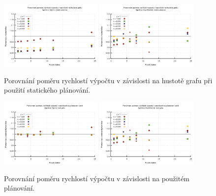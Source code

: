 \begin{figure}
    \centering
    \includegraphics[width=0.45\textwidth]{../grafy/02_openMP/02-04-Dijkstra_hustota_v1}
    \includegraphics[width=0.45\textwidth]{../grafy/02_openMP/02-04-Floyd_hustota_v1}
    \caption{Porovnání poměru rychlostí výpočtu v závislosti na hustotě grafu při použití statického plánování.}
    \label{f:mer:pomerhustota}
\end{figure}

\begin{figure}
    \centering
    \includegraphics[width=0.45\textwidth]{../grafy/02_openMP/02-05-Dijkstra_schedule_v1}
    \includegraphics[width=0.45\textwidth]{../grafy/02_openMP/02-05-Floyd_schedule_v1}
    \caption{Porovnání poměru rychlostí výpočtu v závislosti na použitém plánování.}
    \label{f:mer:pomerplanovani}
\end{figure}

